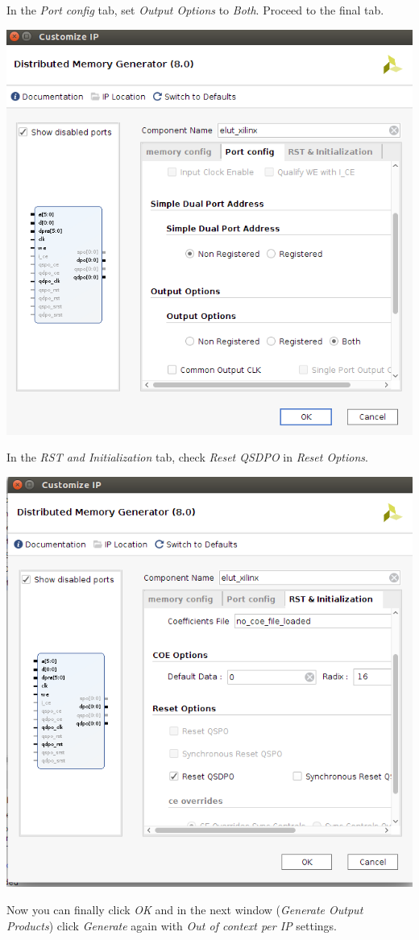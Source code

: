 \documentclass{article}
\begin{document}
\begin{enumerate}
    In the \emph{Port config} tab, set \emph{Output Options} to \emph{Both}. Proceed to the final tab.

    \includegraphics[width=0.7\linewidth]{Figures/vivado14.png}

    In the \emph{RST and Initialization} tab, check \emph{Reset QSDPO} in \emph{Reset Options}.

    \includegraphics[width=0.7\linewidth]{Figures/vivado15.png}

    Now you can finally click \emph{OK} and in the next window (\emph{Generate Output Products}) click \emph{Generate} again with \emph{Out of context per IP} settings. %
    

\end{enumerate}
\end{document}
